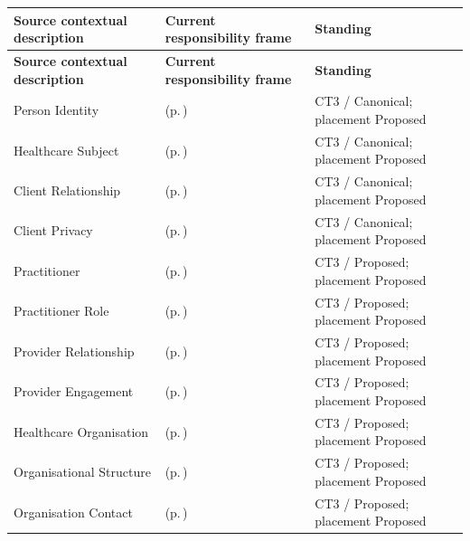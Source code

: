\begin{longtable}{|>{\raggedright\arraybackslash}p{0.37\TableWidth}|>{\raggedright\arraybackslash}p{0.4\TableWidth}|>{\raggedright\arraybackslash}p{0.23\TableWidth}|}
\hline\rowcolor{TableHead}\textbf{Source contextual description} & \textbf{Current responsibility frame} & \textbf{Standing}\\\hline\endfirsthead
\hline\rowcolor{TableHead}\textbf{Source contextual description} & \textbf{Current responsibility frame} & \textbf{Standing}\\\hline\endhead
\hline\endfoot
Person Identity & \nameref{cap:bec-person-identity} (p.\,\pageref{cap:bec-person-identity}) & CT3 / Canonical; placement Proposed\\\hline
Healthcare Subject & \nameref{cap:bec-healthcare-subject} (p.\,\pageref{cap:bec-healthcare-subject}) & CT3 / Canonical; placement Proposed\\\hline
Client Relationship & \nameref{cap:bec-client-relationship} (p.\,\pageref{cap:bec-client-relationship}) & CT3 / Canonical; placement Proposed\\\hline
Client Privacy & \nameref{cap:bec-client-privacy} (p.\,\pageref{cap:bec-client-privacy}) & CT3 / Canonical; placement Proposed\\\hline
Practitioner & \nameref{cap:bec-practitioner} (p.\,\pageref{cap:bec-practitioner}) & CT3 / Proposed; placement Proposed\\\hline
Practitioner Role & \nameref{cap:bec-practitioner-role} (p.\,\pageref{cap:bec-practitioner-role}) & CT3 / Proposed; placement Proposed\\\hline
Provider Relationship & \nameref{cap:bec-practitioner-role} (p.\,\pageref{cap:bec-practitioner-role}) & CT3 / Proposed; placement Proposed\\\hline
Provider Engagement & \nameref{cap:bec-reviewed-provider-clinical-qualification-tracking} (p.\,\pageref{cap:bec-reviewed-provider-clinical-qualification-tracking}) & CT3 / Proposed; placement Proposed\\\hline
Healthcare Organisation & \nameref{cap:bec-healthcare-organisation} (p.\,\pageref{cap:bec-healthcare-organisation}) & CT3 / Proposed; placement Proposed\\\hline
Organisational Structure & \nameref{cap:bec-healthcare-organisation} (p.\,\pageref{cap:bec-healthcare-organisation}) & CT3 / Proposed; placement Proposed\\\hline
Organisation Contact & \nameref{cap:bec-healthcare-organisation} (p.\,\pageref{cap:bec-healthcare-organisation}) & CT3 / Proposed; placement Proposed\\\hline

\end{longtable}
